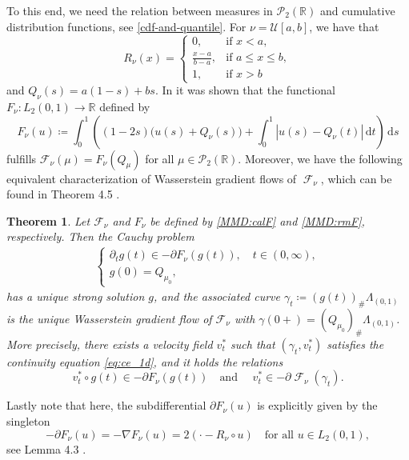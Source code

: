 \documentclass{article}
\newcommand{\R}{\mathbb{R}}
\renewcommand{\d}{\, \mathrm{d}}
\DeclareMathOperator{\F}{\mathcal F}
\newcommand{\lebesgue}{\Lambda}
\theoremstyle{plain}
\newtheorem{theorem}{Theorem}[section]
\theoremstyle{definition}
\theoremstyle{remark}
\begin{document}
To this end, we need the relation between measures in $\mathcal P_2(\R)$  and cumulative distribution functions, see \eqref{cdf-and-quantile}.
For $\nu = \mathcal{U}[a, b]$, we have that
\begin{equation*}
       {  R}_{\nu}(x)         = \begin{cases}
            0, & \text{if } x < a, \\
            \frac{x - a}{b - a}, & \text{if } a \le x \le b, \\
            1, & \text{if } x > b
        \end{cases}
    \end{equation*}
and
$
Q_{\nu}(s) = a(1-s) + bs
$.
In \cite{HGBS2022} it was shown that the functional  $F_{\nu} \colon L_2(0, 1) \to \R$ defined by
\begin{equation}\label{MMD:rmF}
     F_{\nu}(u)
    \coloneqq \int_{0}^{1} \left( (1 - 2 s) \big( u(s) + Q_{\nu}(s)\big)
    + \int_{0}^{1} | u(s) - Q_{\nu}(t) | \d{t} \right) \d{s}
\end{equation}
fulfills $\mathcal F_\nu(\mu) = F_\nu(Q_\mu)$ for all
$\mu \in \mathcal P_2(\R)$.
Moreover, we have the following equivalent characterization of Wasserstein gradient flows of $\F_\nu$, which can be found in Theorem 4.5 \cite{DSBHS2024}.
\begin{theorem} \label{main_mmd}
Let $\mathcal F_\nu$ and $F_\nu$ be defined 
by \eqref{MMD:calF} and \eqref{MMD:rmF}, respectively.
Then the Cauchy problem
\begin{align}\label{eq:cauchy2}
    \begin{cases}
        \partial_t g(t) \in  -\partial F_\nu (g(t)),   \quad  t \in (0,\infty), \\
         g(0) = Q_{\mu_0},
    \end{cases}
\end{align}
has a unique strong solution $g$,
and the associated curve
$\gamma_t \coloneqq (g(t))_\# \Lambda_{(0,1)}$
is the unique Wasserstein gradient flow of $\mathcal F_\nu$ with $\gamma(0+) = (Q_{\mu_0})_{\#} \lebesgue_{(0,1)}$. More precisely, there exists a velocity field $v_t^*$ such that $(\gamma_t, v_t^*)$ satisfies the continuity equation \eqref{eq:ce_1d}, and it holds the relations 
\begin{equation}\label{v_in_subdiff}
    v_t^* \circ g(t) \in -\partial F_\nu (g(t)) 
    \quad \text{and } \quad 
    v_t^* \in -\partial \F_\nu (\gamma_t). 
\end{equation}
\end{theorem}
Lastly note that here, the subdifferential $\partial F_\nu(u)$ is explicitly given by the singleton
\begin{equation}
- \partial F_\nu(u) 
= - \nabla F_\nu(u) 
= 2(\cdot - {  R}_\nu \circ u ) \quad \text{for all } u \in L_2(0,1),
\end{equation}
see Lemma 4.3 \cite{DSBHS2024}.
\end{document}

